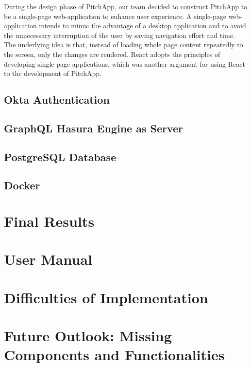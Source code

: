 During the design phase of PitchApp, our team decided to construct PitchApp to be a single-page web-application to enhance user experience. A single-page web-application intends to mimic the advantage of a desktop application and to avoid the unnecessary interruption of the user by saving navigation effort and time. The underlying idea is that, instead of loading whole page content repeatedly to the screen, only the changes are rendered. React adopts the principles of developing single-page applications, which was another argument for using React to the development of PitchApp. 

\section{Okta Authentication}
\section{GraphQL Hasura Engine as Server}
\section{PostgreSQL Database}
\section{Docker}
\chapter{Final Results}
\chapter{User Manual}
\chapter{Difficulties of Implementation}
\chapter{Future Outlook: Missing Components and Functionalities}



